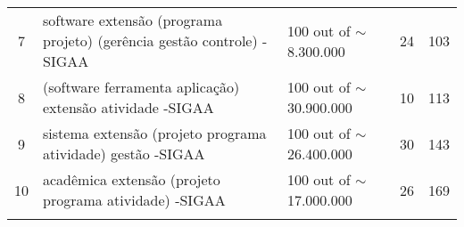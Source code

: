 \begin{table}
\begin{tabular}{c|p{6cm}|l|p{1.5cm}|c}
    \rowcolor[rgb]{0.898,0.898,0.898} 7            & software extensão (programa \textbar{} projeto) (gerência \textbar{} gestão \textbar{} controle) -SIGAA                     & 100 out of $\sim$8.300.000  & 24                                                               & 103            \\
    8                                              & (software \textbar{} ferramenta \textbar{} aplicação) extensão atividade -SIGAA                                             & 100 out of $\sim$30.900.000 & 10                                                               & 113            \\
    \rowcolor[rgb]{0.898,0.898,0.898} 9            & sistema extensão (projeto \textbar{} programa \textbar{} atividade) gestão -SIGAA                                           & 100 out of $\sim$26.400.000 & 30                                                               & 143            \\
    10                                             & acadêmica extensão (projeto \textbar{} programa \textbar{} atividade) -SIGAA                                                & 100 out of $\sim$17.000.000 & 26                                                               & 169            \\
    \arrayrulecolor{black}\toprule
  \end{tabular}
\end{table}